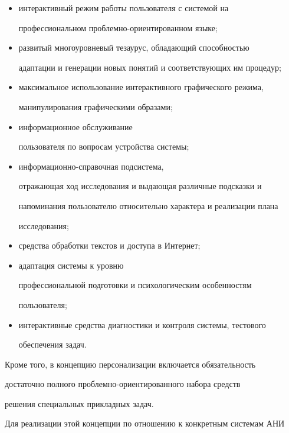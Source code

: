 \begin{itemize}


\item  интерактивный режим работы пользователя с системой на


профессиональном проб\-лем\-но-ориенти\-ро\-ван\-ном языке;


\item  развитый многоуровневый тезаурус, обладающий способностью


адаптации и генерации новых понятий и соответствующих им процедур;


\item   максимальное использование интерактивного графического режима,


манипулирования графическими образами;


\item  информационное обслуживание


пользователя по вопросам  устройства сис\-темы;


\item  информационно-справочная подсистема,


отражающая ход исследования и выдающая различные подсказки и


напоминания пользователю относительно характера и реализации плана


исследования;


\item средства обработки текстов и доступа в Интернет;


\item  адаптация системы к уровню


профессиональной подготовки и психологическим особенностям


пользователя;


\item интерактивные средства диагностики и контроля системы, тестового


обеспечения задач.


\end{itemize}





Кроме того, в концепцию персонализации включается обязательность


достаточно полного проб\-лем\-но-ориенти\-ро\-ван\-но\-го набора средств


решения специальных прикладных задач.


Для реализации этой концепции по отношению к конкретным системам АНИ


